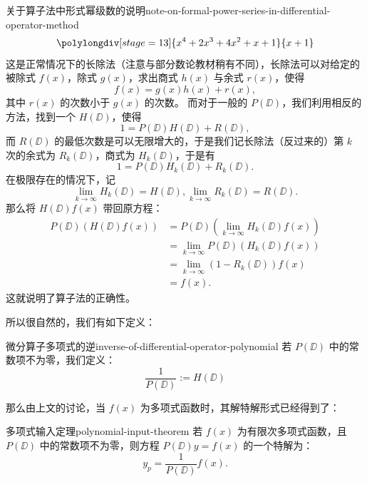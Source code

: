 \begin{note}{关于算子法中形式幂级数的说明}{note-on-formal-power-series-in-differential-operator-method}
    \begin{equation*}
        \polylongdiv[stage=13]{x^4 + 2x^3 + 4x^2 + x + 1}{x + 1}
    \end{equation*}
    这是正常情况下的长除法（注意与部分数论教材稍有不同），长除法可以对给定的被除式 $ f(x) $，除式 $ g(x) $，求出商式 $ h(x) $ 与余式 $ r(x) $，使得
    \begin{equation*}
        f(x) = g(x) h(x) + r(x) ,
    \end{equation*}
    其中 $ r(x) $ 的次数小于 $ g(x) $ 的次数。
    而对于一般的 $ P(\DD) $，我们利用相反的方法，找到一个 $ H(\DD) $，使得
    \begin{equation*}
        1 = P(\DD) H(\DD) + R(\DD) ,
    \end{equation*}
    而 $ R(\DD) $ 的最低次数是可以无限增大的，于是我们记长除法（反过来的）第 $ k $ 次的余式为 $ R_k (\DD) $，商式为 $ H_k (\DD) $，于是有
    \begin{equation*}
        1 = P(\DD) H_k (\DD) + R_k (\DD) .
    \end{equation*}
    在极限存在的情况下，记
    \begin{equation*}
        \lim_{k \to \infty} H_k (\DD) = H(\DD) ,
        \lim_{k \to \infty} R_k (\DD) = R(\DD) .
    \end{equation*}
    那么将 $ H(\DD)f(x) $ 带回原方程：
    \begin{equation*}
        \begin{aligned}
            P(\DD)(H(\DD) f(x)) & = P(\DD) \left( \lim_{k \to \infty} H_k (\DD) f(x) \right) \\
                                & = \lim_{k \to \infty} P(\DD) (H_k (\DD) f(x))              \\
                                & = \lim_{k \to \infty} (1 - R_k (\DD)) f(x)                 \\
                                & = f(x).
        \end{aligned}
    \end{equation*}
    这就说明了算子法的正确性。

\end{note}

所以很自然的，我们有如下定义：
\begin{definition}{微分算子多项式的逆}{inverse-of-differential-operator-polynomial}
    若 $ P(\DD) $ 中的常数项不为零，我们定义：
    \begin{equation}
        \frac{1}{P(\DD)} := H(\DD)
    \end{equation}
\end{definition}
那么由上文的讨论，当 $ f(x) $ 为多项式函数时，其解特解形式已经得到了：
\begin{theorem}{多项式输入定理}{polynomial-input-theorem}
    若 $ f(x) $ 为有限次多项式函数，且 $ P(\DD) $ 中的常数项不为零，则方程 $ P(\DD) y = f(x) $ 的一个特解为：
    \begin{equation}
        y_p = \frac{1}{P(\DD)} f(x) .
    \end{equation}
\end{theorem}

